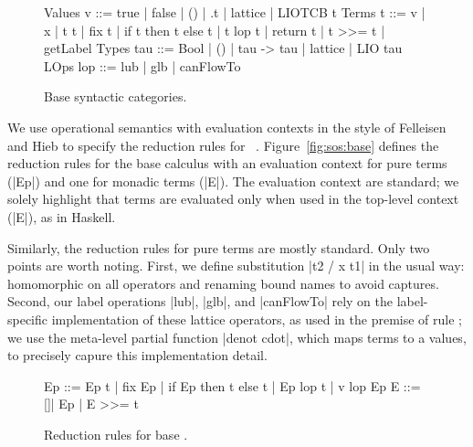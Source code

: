 \begin{figure}
\small
\centering
\begin{code}
Values  v    ::=  true | false | () | \x.t | lattice | LIOTCB t
Terms   t    ::=  v | x | t t | fix t | if t then t else t
               |  t lop t | return t | t >>= t | getLabel
Types   tau  ::=  Bool | () | tau -> tau | lattice | LIO tau  
LOps    lop  ::=  lub | glb | canFlowTo
\end{code}
\caption{Base \lio{} syntactic categories.
\label{fig:language:base}}
\end{figure}

We use operational semantics with evaluation contexts in the style of
Felleisen and Hieb to specify the reduction rules for \lio~\tocite{}.
%
Figure~\ref{fig:sos:base} defines the reduction rules for the base
calculus with an evaluation context for pure
terms (|Ep|) and one for monadic terms (|E|).
%
The evaluation context are standard; we solely highlight that terms
are evaluated only when used in the top-level context (|E|), as in
Haskell.

Similarly, the reduction rules for pure terms are mostly standard.
%
Only two points are worth noting.
%
First, we define substitution |{t2 / x } t1| in the usual way:
homomorphic on all operators and renaming bound names to avoid
captures. 
%
Second, our label operations |lub|, |glb|, and |canFlowTo| rely on the
label-specific implementation of these lattice operators, as used in
the premise of rule ;
%
we use the meta-level partial function |denot cdot|, which maps terms
to a values, to precisely capure this implementation detail.

\begin{figure}[t] %
\small
\begin{code}
Ep  ::= Ep t | fix Ep | if Ep then t else t | Ep lop t | v lop Ep
E   ::= []| Ep | E >>= t 
\end{code}

\caption{Reduction rules for base \lio.\label{lio:sos:base}}
\end{figure}

